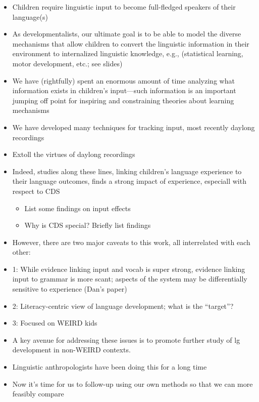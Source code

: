 \documentclass[man]{apa6}
\providecommand{\tightlist}{%
  \setlength{\itemsep}{0pt}\setlength{\parskip}{0pt}}
\theoremstyle{definition}
\theoremstyle{definition}
\theoremstyle{definition}
\theoremstyle{remark}
\begin{document}
\begin{itemize}
\tightlist
\item
  Children require linguistic input to become full-fledged speakers of
  their language(s)
\item
  As developmentalists, our ultimate goal is to be able to model the
  diverse mechanisms that allow children to convert the linguistic
  information in their environment to internalized linguistic knowledge,
  e.g., (statistical learning, motor development, etc.; see slides)
\item
  We have (rightfully) spent an enormous amount of time analyzing what
  information exists in children's input---such information is an
  important jumping off point for inspiring and constraining theories
  about learning mechanisms
\item
  We have developed many techniques for tracking input, most recently
  daylong recordings
\item
  Extoll the virtues of daylong recordings
\item
  Indeed, studies along these lines, linking children's language
  experience to their language outcomes, finds a strong impact of
  experience, especiall with respect to CDS

  \begin{itemize}
  \tightlist
  \item
    List some findings on input effects
  \item
    Why is CDS special? Briefly list findings
  \end{itemize}
\item
  However, there are two major caveats to this work, all interrelated
  with each other:
\item
  1: While evidence linking input and vocab is super strong, evidence
  linking input to grammar is more scant; aspects of the system may be
  differentially sensitive to experience (Dan's paper)
\item
  2: Literacy-centric view of language development; what is the
  \enquote{target}?
\item
  3: Focused on WEIRD kids
\item
  A key avenue for addressing these issues is to promote further study
  of lg development in non-WEIRD contexts.
\item
  Linguistic anthropologists have been doing this for a long time
\item
  Now it's time for us to follow-up using our own methods so that we can
  more feasibly compare


\end{itemize}
\end{document}
